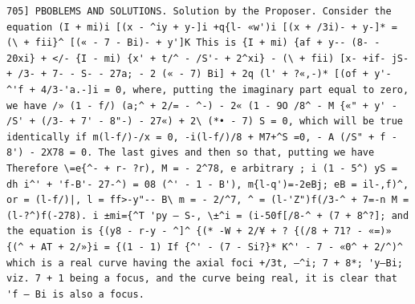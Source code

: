 \documentclass[11pt,a4paper]{book}
\begin{document}
\newpage
\setcounter{page}{597}
\begin{verbatim}
705] PBOBLEMS AND SOLUTIONS. Solution by the Proposer. Consider the equation (I + mi)i [(x - ^iy + y-]i +q{l- «w')i [(x + /3i)- + y-]* = (\ + fii}^ [(« - 7 - Bi)- + y']K This is {I + mi) {af + y-- (8- - 20xi} + </- {I - mi) {x' + t/^ - /S'- + 2^xi} - (\ + fii) [x- +if- jS- + /3- + 7- - S- - 27a; - 2 (« - 7) Bi] + 2q (l' + ?«,-)* [(of + y'- ^'f + 4/3-'a.-]i = 0, where, putting the imaginary part equal to zero, we have /» (1 - f/) (a;^ + 2/= - ^-) - 2« (1 - 9O /8^ - M {«" + y' - /S' + (/3- + 7' - 8"-) - 27«) + 2\ (*• - 7) S = 0, which will be true identically if m(l-f/)-/x = 0, -i(l-f/)/8 + M7+^S =0, - A (/S" + f - 8') - 2X78 = 0. The last gives and then so that, putting we have Therefore \=e{^- + r- ?r), M = - 2^78, e arbitrary ; i (1 - 5^) yS = dh i^' + 'f-B'- 27-^) = 08 (^' - 1 - B'), m{l-q')=-2eBj; eB = il-,f)^, or = (l-f/)|, l = ff>-y"-- B\ m = - 2/^7, ^ = (l-'Z")f(/3-^ + 7=-n M = (l-?^)f(-278). i ±mi={^T 'py — S-, \±^i = (i-50f[/8-^ + (7 + 8^?]; and the equation is {(y8 - r-y - ^]^ {(* -W + 2/¥ + ? {(/8 + 71? - «=)» {(^ + AT + 2/»}i = {(1 - 1) If {^' - (7 - Si?}* K^' - 7 - «0^ + 2/^)^ which is a real curve having the axial foci +/3t, —^i; 7 + 8*; 'y—Bi; viz. 7 + 1 being a focus, and the curve being real, it is clear that 'f — Bi is also a focus. 
\end{verbatim}
\end{document}
